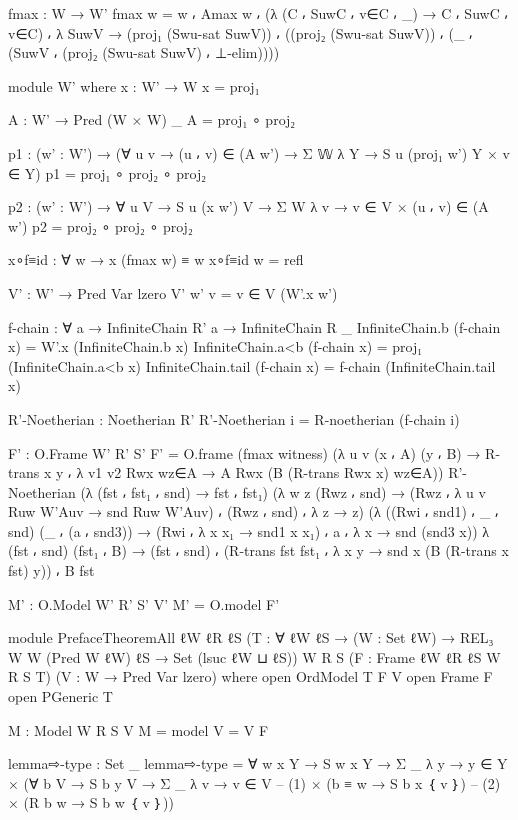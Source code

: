 \begin{spverbatim}
  fmax : W → W'
  fmax w = w ⸴ Amax w ⸴ (λ { (C ⸴ SuwC ⸴ v∈C ⸴ _) → C ⸴ SuwC ⸴ v∈C})
    ⸴ λ {SuwV → (proj₁ (Swu-sat SuwV)) ⸴ ((proj₂ (Swu-sat SuwV)) ⸴
    (_ ⸴ (SuwV ⸴ (proj₂ (Swu-sat SuwV) ⸴ ⊥-elim))))}

  module W' where
    x : W' → W
    x = proj₁

    A : W' → Pred (W × W) _
    A = proj₁ ∘ proj₂

    p1 : (w' : W')
       → (∀ {u v} → (u ⸴ v) ∈ (A w') → Σ 𝕎 λ Y → S u (proj₁ w') Y × v ∈ Y)
    p1 = proj₁ ∘ proj₂ ∘ proj₂

    p2 : (w' : W') → ∀ {u V} → S u (x w') V → Σ W λ v → v ∈ V × (u ⸴ v) ∈ (A w')
    p2 = proj₂ ∘ proj₂ ∘ proj₂

    x∘f≡id : ∀ w → x (fmax w) ≡ w
    x∘f≡id w = refl

  V' : W' → Pred Var lzero
  V' w' v = v ∈ V (W'.x w')

  f-chain : ∀ {a} → InfiniteChain R' a → InfiniteChain R _
  InfiniteChain.b (f-chain x) = W'.x (InfiniteChain.b x)
  InfiniteChain.a<b (f-chain x) = proj₁ (InfiniteChain.a<b x)
  InfiniteChain.tail (f-chain x) = f-chain (InfiniteChain.tail x)

  R'-Noetherian : Noetherian R'
  R'-Noetherian i = R-noetherian (f-chain i)

  F' : O.Frame W' R' S'
  F' = O.frame
    (fmax witness)
    (λ { {u} {v} (x ⸴ A) (y ⸴ B) → R-trans x y ⸴
    λ { {v1} {v2} Rwx wz∈A → A Rwx (B (R-trans Rwx x) wz∈A)}})
    R'-Noetherian
    (λ { (fst ⸴ fst₁ ⸴ snd) → fst ⸴ fst₁})
    (λ { {w} {z} (Rwz ⸴ snd) →
    (Rwz ⸴ λ { {u} {v} Ruw W'Auv → snd Ruw W'Auv}) ⸴ (Rwz ⸴ snd) ⸴ λ z → z})
    (λ { ((Rwi ⸴ snd1) ⸴ _ ⸴ snd) (_ ⸴ (a ⸴ snd3))
      → (Rwi ⸴
      λ {x x₁ → snd1 x x₁}) ⸴ a ⸴ λ { x → snd (snd3 x)}})
    λ { (fst ⸴ snd) (fst₁ ⸴ B) → (fst ⸴ snd) ⸴
    (R-trans fst fst₁ ⸴ λ {x y → snd x (B (R-trans x fst) y)}) ⸴ B fst}

  M' : O.Model W' R' S' V'
  M' = O.model F'

module PrefaceTheoremAll
  {ℓW ℓR ℓS}
  (T : ∀ {ℓW ℓS} → (W : Set ℓW) → REL₃ W W (Pred W ℓW) ℓS → Set (lsuc ℓW ⊔ ℓS))
  {W R S}
  (F : Frame {ℓW} {ℓR} {ℓS} W R S T)
  (V : W → Pred Var lzero)
  where
  open OrdModel T F V
  open Frame F
  open PGeneric T

  M : Model W R S V
  M = model {V = V} F

  lemma⇨-type : Set _
  lemma⇨-type =
    ∀ {w x Y} → S w x Y →
    Σ _ λ y → y ∈ Y
    × (∀ {b V} → S b y V
      → Σ _ λ v → v ∈ V
      -- (1)
      × (b ≡ w → S b x ｛ v ｝)
      -- (2)
      × (R b w → S b w ｛ v ｝))


\end{spverbatim}
